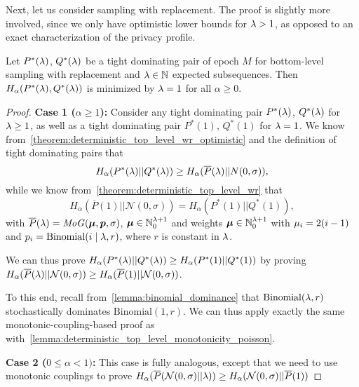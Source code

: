 Next, let us consider sampling with replacement. The proof is slightly more involved, since we only have optimistic lower bounds for $\lambda > 1$, as opposed to an exact characterization of the privacy profile.
\begin{lemma}
    Let $P^{*}(\lambda)$, $Q^{*}(\lambda)$ be a tight dominating pair of epoch $M$ for bottom-level sampling with replacement and $\lambda \in {\mathbb{N}}$ expected subsequences.
    Then $H_\alpha(P^{*}(\lambda), Q^{*}(\lambda))$ is minimized by $\lambda = 1$ for all $\alpha \geq 0$.
\end{lemma}
\begin{proof}
    \textbf{Case 1 ($\alpha \geq 1$):}
    Consider any tight dominating pair $P^{*}(\lambda)$, $Q^{*}(\lambda)$ for $\lambda  \geq 1$,
    as well as a tight dominating pair $P^{*}(1)$, $Q^{*}(1)$ for $\lambda = 1$.
    We know from~\cref{theorem:deterministic_top_level_wr_optimistic} and the definition of tight dominating pairs that
    \begin{equation*}
        H_\alpha(P^{*}(\lambda) || Q^{*}(\lambda)) \geq H_\alpha(\overline{P}(\lambda) || N(0, \sigma)),
    \end{equation*}
    while we know from~\cref{theorem:deterministic_top_level_wr} that 
    \begin{equation*}
        H_\alpha(\overline{P}(1) || \mathcal{N}(0,\sigma)) = H_\alpha(P^{*}(1) || Q^{*}(1)),
    \end{equation*}
    with $\overline{P}(\lambda) = \mathit{MoG}({\bm{\mu}}, {\bm{p}}, \sigma)$, 
    ${\bm{\mu}} \in {\mathbb{N}}_0^{\lambda +1}$ and weights ${\bm{\mu}} \in {\mathbb{N}}_0^{\lambda +1}$
    with ${\mu}_i = 2 (i-1)$
    and ${p}_i = \mathrm{Binomial}(i \mid \lambda, r)$,
    where $r$ is constant in $\lambda$.

    We can thus prove $H_\alpha(P^{*}(\lambda) || Q^{*}(\lambda)) \geq H_\alpha(P^{*}(1) || Q^{*}(1))$
    by proving $H_\alpha(\overline{P}(\lambda) || \mathcal{N}(0,\sigma)) \geq H_\alpha(\overline{P}(1) || \mathcal{N}(0,\sigma))$.
    
    To this end, recall from~\cref{lemma:binomial_dominance} that $\mathrm{Binomial}(\lambda, r)$ stochastically dominates 
    $\mathrm{Binomial}(1, r)$. We can thus apply exactly the same monotonic-coupling-based proof as with~\cref{lemma:deterministic_top_level_monotonicity_poisson}.

    \textbf{Case 2 ($0 \leq \alpha < 1)$:}
    This case is fully analogous, except that we need to use monotonic couplings to prove 
    $H_\alpha(\overline{P}(\mathcal{N}(0,\sigma) || \lambda)) \geq H_\alpha(\mathcal{N}(0,\sigma) || \overline{P}(1))$
\end{proof}